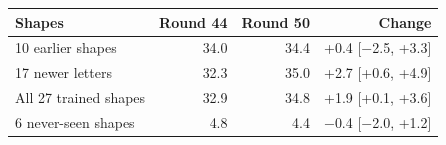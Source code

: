 
\begin{tabular}{lrrr}
\toprule
Shapes & Round 44 & Round 50 & Change \\
\midrule
10 earlier shapes & 34.0 & 34.4 & +0.4 [$-$2.5, +3.3] \\
17 newer letters & 32.3 & 35.0 & +2.7 [+0.6, +4.9] \\
All 27 trained shapes & 32.9 & 34.8 & +1.9 [+0.1, +3.6] \\
6 never-seen shapes & 4.8 & 4.4 & $-$0.4 [$-$2.0, +1.2] \\
\bottomrule
\end{tabular}
